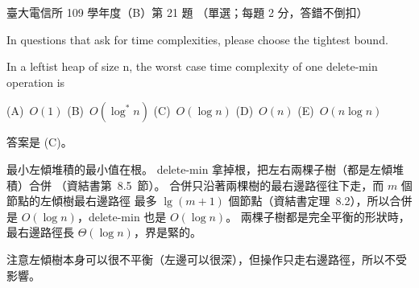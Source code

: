 \begin{pastexam}[label={px:ntu-109-comm-dsa-21}]{臺大電信所 109 學年度（B）第 21 題}
（單選；每題 2 分，答錯不倒扣）

In questions that ask for time complexities, please choose the tightest bound.

In a leftist heap of size n, the worst case time complexity of one delete-min operation is

(A)~$O(1)$ \qquad (B)~$O(\log^* n)$ \qquad (C)~$O(\log n)$ \qquad (D)~$O(n)$ \qquad (E)~$O(n\log n)$
\end{pastexam}

\begin{pastsoln}
答案是 (C)。

最小左傾堆積的最小值在根。 delete-min 拿掉根，把左右兩棵子樹（都是左傾堆積）合併
（資結書第~8.5~節）。 合併只沿著兩棵樹的最右邊路徑往下走，而 $m$ 個節點的左傾樹最右邊路徑
最多 $\lg(m + 1)$ 個節點（資結書定理~8.2），所以合併是 $O(\log n)$，delete-min 也是
$O(\log n)$。 兩棵子樹都是完全平衡的形狀時，最右邊路徑長 $\Theta(\log n)$，界是緊的。

注意左傾樹本身可以很不平衡（左邊可以很深），但操作只走右邊路徑，所以不受影響。
\end{pastsoln}
